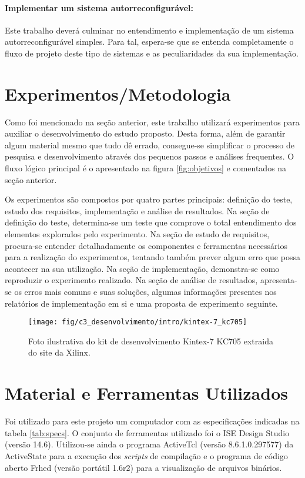 \documentclass[11pt,a4paper,oneside]{book}
\begin{document}
\paragraph{Implementar um sistema autorreconfigurável:} Este trabalho deverá culminar no entendimento e implementação de um sistema autorreconfigurável simples. Para tal, espera-se que se entenda completamente o fluxo de projeto deste tipo de sistemas e as peculiaridades da sua implementação.

\section{Experimentos/Metodologia}
Como foi mencionado na seção anterior, este trabalho utilizará experimentos para auxiliar o desenvolvimento do estudo proposto.
Desta forma, além de garantir algum material mesmo que tudo dê errado, consegue-se simplificar o processo de pesquisa e desenvolvimento através dos pequenos passos e análises frequentes.
O fluxo lógico principal é o apresentado na figura \ref{fig:objetivos} e comentados na seção anterior.

Os experimentos são compostos por quatro partes principais: definição do teste, estudo dos requisitos, implementação e análise de resultados.
Na seção de definição do teste, determina-se um teste que comprove o total entendimento dos elementos explorados pelo experimento.
Na seção de estudo de requisitos, procura-se entender detalhadamente os componentes e ferramentas necessários para a realização do experimentos, tentando também prever algum erro que possa acontecer na sua utilização.
Na seção de implementação, demonstra-se como reproduzir o experimento realizado.
Na seção de análise de resultados, apresenta-se os erros mais comuns e suas soluções, algumas informações presentes nos relatórios de implementação em si e uma proposta de experimento seguinte.

\begin{figure}[h]
\centering
\texttt{[image: fig/c3\_desenvolvimento/intro/kintex-7\_kc705]}
\caption{Foto ilustrativa do kit de desenvolvimento Kintex-7 KC705 extraida do site da Xilinx.}
\label{fig:kc705}
\end{figure} 

\section{Material e Ferramentas Utilizados}
Foi utilizado para este projeto um computador com as especificações indicadas na tabela \ref{tab:specs}.
O conjunto de ferramentas utilizado foi o ISE Design Studio (versão 14.6).
Utilizou-se ainda o programa ActiveTcl (versão 8.6.1.0.297577) da ActiveState para a execução dos \textit{scripts} de compilação e o programa de código aberto Frhed (versão portátil 1.6r2) para a visualização de arquivos binários.
\end{document}
